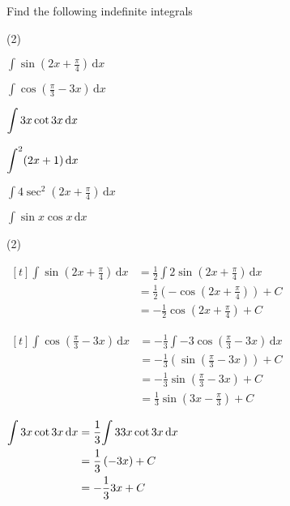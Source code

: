 \documentclass[11pt,a4paper]{book}
\let\csc\relax
\DeclareMathOperator{\csc}{cosec}
\begin{document}
\begin{example}

Find the following indefinite integrals

\begin{tasks}[label=(\alph*),label-width=3.5ex](2)

\task ${\displaystyle \int\sin\left(2x+\frac{\pi}{4}\right)\, \mathrm{d}x}$

\task ${\displaystyle \int\cos\left(\frac{\pi}{3}-3x\right)\, \mathrm{d}x}$

\task  ${\displaystyle \int\csc3x\cot3x\, \mathrm{d}x}$

\task  ${\displaystyle \int\csc^{2}(2x+1)\, \mathrm{d}x}$

\task ${\displaystyle \int4\sec^{2}\left(2x+\frac{\pi}{4}\right)\, \mathrm{d}x}$

\task ${\displaystyle \int\sin x\cos x\, \mathrm{d}x}$

\end{tasks}

\Solution

\begin{tasks}[label=(\alph*),label-width=3.5ex,after-item-skip = 2cm](2)

\task
$
\begin{aligned}[t]
{\displaystyle \int\sin\left(2x+\frac{\pi}{4}\right)\, \mathrm{d}x} & =\frac{1}{2}\int2\sin\left(2x+\frac{\pi}{4}\right)\, \mathrm{d}x\\
 & =\frac{1}{2}\left(-\cos\left(2x+\frac{\pi}{4}\right)\right)+C\\
 & =-\frac{1}{2}\cos\left(2x+\frac{\pi}{4}\right)+C
\end{aligned}
$

\task
$
\begin{aligned}[t]
\int\cos\left(\frac{\pi}{3}-3x\right)\, \mathrm{d}x & =-\frac{1}{3}\int-3\cos\left(\frac{\pi}{3}-3x\right)\, \mathrm{d}x\\
 & =-\frac{1}{3}\left(\sin\left(\frac{\pi}{3}-3x\right)\right)+C\\
 & =-\frac{1}{3}\sin\left(\frac{\pi}{3}-3x\right)+C\\
 & =\frac{1}{3}\sin\left(3x-\frac{\pi}{3}\right)+C
\end{aligned}
$

\task
$
\begin{aligned}[t]
{\displaystyle \int\csc3x\cot3x\, \mathrm{d}x} & =\frac{1}{3}{\displaystyle \int3\csc3x\cot3x\, \mathrm{d}x}\\
 & =\frac{1}{3}\left(-\csc3x\right)+C\\
 & =-\frac{1}{3}\csc3x+C
\end{aligned}
$


\end{tasks}
\end{example}
\end{document}
